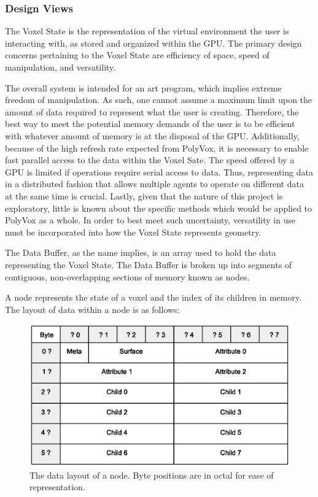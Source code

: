 \documentclass[onecolumn, draftclsnofoot,10pt, compsoc]{IEEEtran}
\newcounter{threesection}[subsubsection]
\newcounter{foursection}[threesection]
\begin{document}
\subsubsection{Design Views}


The Voxel State is the representation of the virtual environment the user is interacting with, as stored and organized within the GPU.
The primary design concerns pertaining to the Voxel State are efficiency of space, speed of manipulation, and versatility. 

The overall system is intended for an art program, which implies extreme freedom of manipulation. 
As such, one cannot assume a maximum limit upon the amount of data required to represent what the user is creating.
Therefore, the best way to meet the potential memory demands of the user is to be efficient with whatever amount of memory is at the disposal of the GPU.
Additionally, because of the high refresh rate expected from PolyVox, it is necessary to enable fast parallel access to the data within the Voxel Sate.
The speed offered by a GPU is limited if operations require serial access to data.
Thus, representing data in a distributed fashion that allows multiple agents to operate on different data at the same time is crucial.
Lastly, given that the nature of this project is exploratory, little is known about the specific methods which would be applied to PolyVox as a whole.
In order to best meet such uncertainty, versatility in use must be incorporated into how the Voxel State represents geometry.


The Data Buffer, as the name implies, is an array used to hold the data representing the Voxel State.
The Data Buffer is broken up into segments of contiguous, non-overlapping sections of memory known as nodes.

A node represents the state of a voxel and the index of its children in memory. The layout of data within a node is as follows: \\

\begin{figure}[H]
\begin{center}
\includegraphics[width=\textwidth, viewport=50 120 475 380, clip=true]{nodeLayout.eps}
\caption{The data layout of a node. Byte positions are in octal for ease of representation.}
\end{center}
\end{figure}
\end{document}
